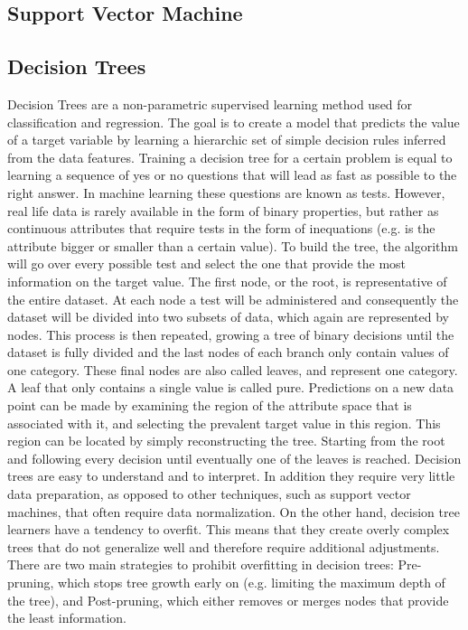 \subsection{Support Vector Machine}




\subsection{Decision Trees}
Decision Trees are a non-parametric supervised learning method used for classification and regression. The goal is to create a model that predicts the value of a target variable by learning a hierarchic set of simple decision rules inferred from the data features. Training a decision tree for a certain problem is equal to learning a sequence of yes or no questions that will lead as fast as possible to the right answer. In machine learning these questions are known as tests. However, real life data is rarely available in the form of binary properties, but rather as continuous attributes that require tests in the form of inequations (e.g. is the attribute bigger or smaller than a certain value).     To build the tree, the algorithm will go over every possible test and select the one that provide the most information on the target value. The first node, or the root, is representative of the entire dataset. At each node a test will be administered and consequently the dataset will be divided into two subsets of data, which again are represented by nodes. This process is then repeated, growing a tree of binary decisions until the dataset is fully divided and the last nodes of each branch only contain values of one category. These final nodes are also called leaves, and represent one category. A leaf that only contains a single value is called pure. Predictions on a new data point can be made by examining the region of the attribute space that is associated with it, and selecting the prevalent target value in this region. This region can be located by simply reconstructing the tree. Starting from the root and following every decision until eventually one of the leaves is reached.
Decision trees are easy to understand and to interpret. In addition they require  very little data preparation, as opposed to other techniques, such as support vector machines, that often require data normalization. On the other hand, decision tree learners have a tendency to overfit. This means that they create overly complex trees that do not generalize well and therefore require additional adjustments. There are two main strategies to prohibit overfitting in decision trees: Pre-pruning, which stops tree growth early on (e.g. limiting the maximum depth of the tree), and Post-pruning, which either removes or merges nodes that provide the least information.

